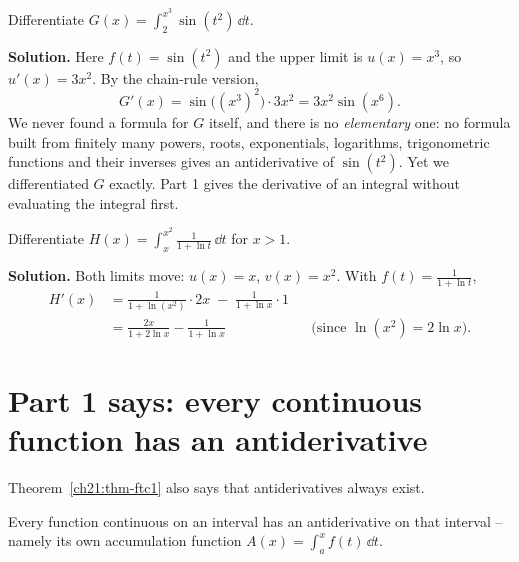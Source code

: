 \begin{example}\label{ch21:ex-chain}
Differentiate $\displaystyle G(x)=\int_2^{x^3}\sin(t^2)\,\dd t$.

\textbf{Solution.} Here $f(t)=\sin(t^2)$ and the upper limit is $u(x)=x^3$, so
$u'(x)=3x^2$. By the chain-rule version,
\[
  G'(x) = \sin\big((x^3)^2\big)\cdot 3x^2 = 3x^2\sin(x^6).
\]
We never found a formula for $G$ itself, and there is no \emph{elementary} one:
no formula built from finitely many powers, roots, exponentials, logarithms,
trigonometric functions and their inverses gives an antiderivative of
$\sin(t^2)$. Yet we differentiated $G$ exactly. Part 1 gives the derivative of an
integral without evaluating the integral first.
\end{example}

\begin{example}\label{ch21:ex-chain2}
Differentiate $\displaystyle H(x)=\int_{x}^{x^2}\frac{1}{1+\ln t}\,\dd t$ for
$x>1$.

\textbf{Solution.} Both limits move: $u(x)=x$, $v(x)=x^2$. With
$f(t)=\frac{1}{1+\ln t}$,
\begin{align*}
  H'(x) &= \frac{1}{1+\ln(x^2)}\cdot 2x \;-\; \frac{1}{1+\ln x}\cdot 1\\
        &= \frac{2x}{1+2\ln x} - \frac{1}{1+\ln x}
        && \text{(since } \ln(x^2)=2\ln x\text{)}.
\end{align*}
\end{example}

\section{Part 1 says: every continuous function has an antiderivative}

Theorem~\ref{ch21:thm-ftc1} also says that antiderivatives always exist.

\begin{corollary}\label{ch21:cor-exist}
Every function continuous on an interval has an antiderivative on that interval --
namely its own accumulation function $A(x)=\int_a^x f(t)\,\dd t$.
\end{corollary}

